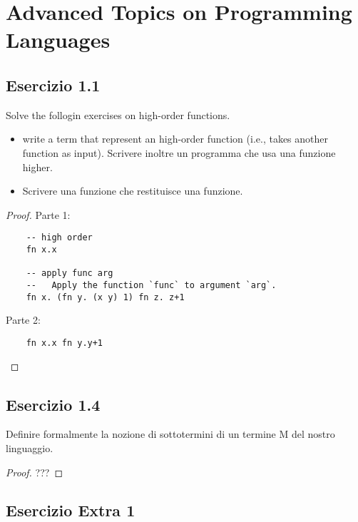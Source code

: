 \documentclass[12pt,a4paper,oneside]{book}
\begin{document}
\chapter{Advanced Topics on Programming Languages}

\section{Esercizio 1.1}

\begin{exercise}
    Solve the follogin exercises on high-order functions. 
    \begin{itemize}
        \item write a term that represent an high-order function (i.e., takes another function as input). Scrivere inoltre un
        programma che usa una funzione higher.
        \item Scrivere una funzione che restituisce una funzione.
    \end{itemize}

\begin{proof}
    Parte 1:
    \begin{verbatim}
    -- high order
    fn x.x
    
    -- apply func arg
    --   Apply the function `func` to argument `arg`.
    fn x. (fn y. (x y) 1) fn z. z+1
    \end{verbatim}
    
    Parte 2:
    \begin{verbatim}
    fn x.x fn y.y+1
    \end{verbatim}
    
\end{proof}

\end{exercise}

\section{Esercizio 1.4}

\begin{exercise}
    Definire formalmente la nozione di sottotermini di un termine M del nostro linguaggio.
    \begin{proof}
        ???
    \end{proof}
\end{exercise}

\section{Esercizio Extra 1}
\end{document}
